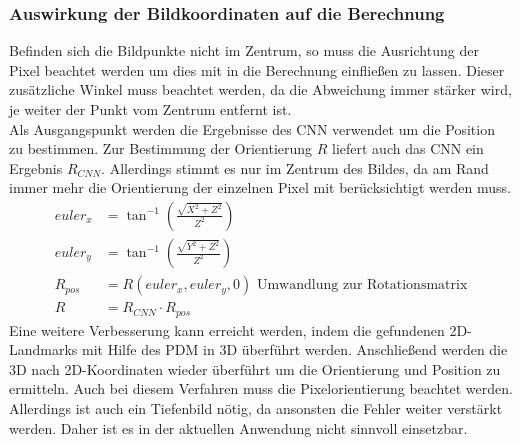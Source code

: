 \subsubsection{Auswirkung der Bildkoordinaten auf die Berechnung}
Befinden sich die Bildpunkte nicht im Zentrum, so muss die Ausrichtung der Pixel beachtet werden um dies mit in die Berechnung einfließen zu lassen. Dieser zusätzliche Winkel muss beachtet werden, da die Abweichung immer stärker wird, je weiter der Punkt vom Zentrum entfernt ist.\\ 
Als Ausgangspunkt werden die Ergebnisse des CNN verwendet um die Position zu bestimmen. Zur Bestimmung der Orientierung $R$ liefert auch das CNN ein Ergebnis $R_{CNN}$. Allerdings stimmt es nur im Zentrum des Bildes, da am Rand immer mehr die Orientierung der einzelnen Pixel mit berücksichtigt werden muss.\\
\begin{align*}
euler_x &= \tan^{-1}(\frac{\sqrt{X^2+Z^2}}{Z^2})\\
euler_y &= \tan^{-1}(\frac{\sqrt{Y^2+Z^2}}{Z^2})\\
R_{pos} &= R(euler_x,euler_y,0)\text{ Umwandlung zur Rotationsmatrix}\\
R &= R_{CNN}\cdot R_{pos}
\end{align*}
Eine weitere Verbesserung kann erreicht werden, indem die gefundenen 2D-Landmarks mit Hilfe des PDM in 3D überführt werden. Anschließend werden die 3D nach 2D-Koordinaten wieder überführt um die Orientierung und Position zu ermitteln. Auch bei diesem Verfahren muss die Pixelorientierung beachtet werden. Allerdings ist auch ein Tiefenbild nötig, da ansonsten die Fehler weiter verstärkt werden. Daher ist es in der aktuellen Anwendung nicht sinnvoll einsetzbar.
